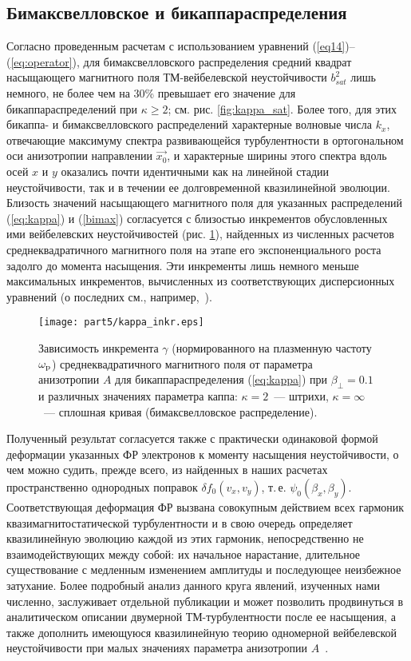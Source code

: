 \subsection{Бимаксвелловское и бикаппа{\PunctumKappa}распределения}

Согласно проведенным расчетам с использованием уравнений (\ref{eq14})--(\ref{eq:operator}), для бимаксвелловского распределения средний квадрат насыщающего магнитного поля ТМ-вейбелевской неустойчивости $b_{sat}^2$ лишь немного, не более чем на 30\% превышает его значение для бикаппа{\PunctumKappa}распределений при $\kappa\geq2$; см. рис. \ref{fig:kappa_sat}. Более того, для этих бикаппа- и бимаксвелловского распределений характерные волновые числа $k_x$, отвечающие максимуму спектра развивающейся турбулентности в ортогональном оси анизотропии направлении $\vec{x_0}$, и характерные ширины этого спектра вдоль осей $x$ и $y$ оказались почти идентичными как на линейной стадии неустойчивости, так и в течении ее долговременной квазилинейной эволюции. Близость значений насыщающего магнитного поля для указанных распределений (\ref{eq:kappa}) и (\ref{bimax}) согласуется с близостью инкрементов обусловленных ими вейбелевских неустойчивостей (рис. \ref{fig:kappa_inkr}), найденных из численных расчетов среднеквадратичного магнитного поля на этапе его экспоненциального роста задолго до момента насыщения. Эти инкременты лишь немного меньше максимальных инкрементов, вычисленных из соответствующих дисперсионных уравнений (о последних см., например,~\cite{Mikhailovsky1971, Lazar2006, Vagin2014, Kocharovsky2016,Ruyer2015,Silva2021}). 
\begin{figure}[h]

\texttt{[image: part5/kappa\_inkr.eps]}
\caption{Зависимость инкремента $\gamma$ (нормированного на плазменную частоту $\omega_\mathrm{p}$) среднеквадратичного магнитного поля от параметра анизотропии $A$ для бикаппа{\PunctumKappa}распределения (\ref{eq:kappa}) при $\beta_\perp=0.1$ и различных значениях параметра каппа: $\kappa=2$~--- штрихи, $\kappa=\infty$~--- сплошная кривая (бимаксвелловское распределение).}
\label{fig:kappa_inkr}
\end{figure}

Полученный результат согласуется также с практически одинаковой формой деформации указанных ФР электронов к моменту насыщения неустойчивости, о чем можно судить, прежде всего, из найденных в наших расчетах пространственно однородных поправок $\delta f_0(v_x, v_y)$, т.\,е. $\psi_0(\beta_x, \beta_y)$. Соответствующая деформация ФР вызвана совокупным действием всех гармоник квазимагнитостатической турбулентности и в свою очередь определяет квазилинейную эволюцию каждой из этих гармоник, непосредственно не взаимодействующих между собой: их начальное нарастание, длительное существование с медленным изменением амплитуды и последующее неизбежное затухание. Более подробный анализ данного круга явлений, изученных нами численно, заслуживает отдельной публикации и может позволить продвинуться в аналитическом описании двумерной ТМ-турбулентности после ее насыщения, а также дополнить имеющуюся квазилинейную теорию одномерной вейбелевской неустойчивости при малых значениях параметра анизотропии $A$~\cite{Pokhotelov2011}. 

